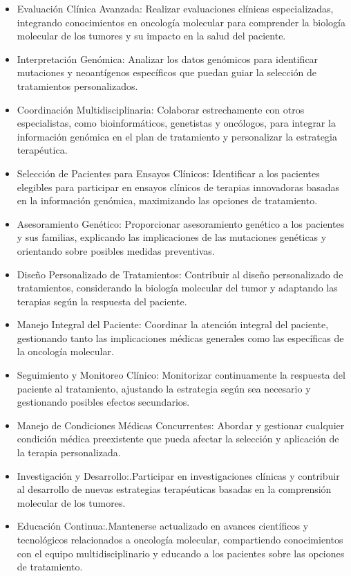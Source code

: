 \documentclass[a4paper,11pt]{article}
\begin{document}
\begin{itemize}
	

\item Evaluación Clínica Avanzada:  Realizar evaluaciones clínicas especializadas, integrando conocimientos en oncología molecular para comprender la biología molecular de los tumores y su impacto en la salud del paciente.
\item Interpretación Genómica: Analizar los datos genómicos para identificar mutaciones y neoantígenos específicos que puedan guiar la selección de tratamientos personalizados.
\item Coordinación Multidisciplinaria:  Colaborar estrechamente con otros especialistas, como bioinformáticos, genetistas y oncólogos, para integrar la información genómica en el plan de tratamiento y personalizar la estrategia terapéutica.
\item Selección de Pacientes para Ensayos Clínicos: Identificar a los pacientes elegibles para participar en ensayos clínicos de terapias innovadoras basadas en la información genómica, maximizando las opciones de tratamiento.
\item  Asesoramiento Genético: Proporcionar asesoramiento genético a los pacientes y sus familias, explicando las implicaciones de las mutaciones genéticas y orientando sobre posibles medidas preventivas.
\item  Diseño Personalizado de Tratamientos: Contribuir al diseño personalizado de tratamientos, considerando la biología molecular del tumor y adaptando las terapias según la respuesta del paciente.
\item  Manejo Integral del Paciente: Coordinar la atención integral del paciente, gestionando tanto las implicaciones médicas generales como las específicas de la oncología molecular.
\item  Seguimiento y Monitoreo Clínico: Monitorizar continuamente la respuesta del paciente al tratamiento, ajustando la estrategia según sea necesario y gestionando posibles efectos secundarios.
\item  Manejo de Condiciones Médicas Concurrentes: Abordar y gestionar cualquier condición médica preexistente que pueda afectar la selección y aplicación de la terapia personalizada.
\item  Investigación y Desarrollo:.Participar en investigaciones clínicas y contribuir al desarrollo de nuevas estrategias terapéuticas basadas en la comprensión molecular de los tumores.
\item  Educación Continua:.Mantenerse actualizado en avances científicos y tecnológicos relacionados a oncología molecular, compartiendo conocimientos con el equipo multidisciplinario y educando a los pacientes sobre las opciones de tratamiento.

\end{itemize}
\end{document}
